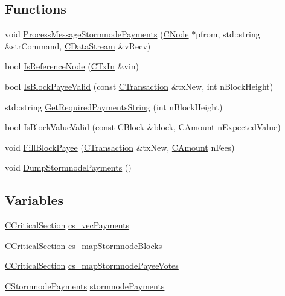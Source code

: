 \subsection*{Functions}
\begin{DoxyCompactItemize}
\item 
void \hyperlink{stormnode-payments_8h_a5233f9d84cc35d13544ea305bc906da0}{Process\+Message\+Stormnode\+Payments} (\hyperlink{class_c_node}{C\+Node} $\ast$pfrom, std\+::string \&str\+Command, \hyperlink{class_c_data_stream}{C\+Data\+Stream} \&v\+Recv)
\item 
bool \hyperlink{stormnode-payments_8h_a0bca99aa555725c39171cc06fb3e94de}{Is\+Reference\+Node} (\hyperlink{class_c_tx_in}{C\+Tx\+In} \&vin)
\item 
bool \hyperlink{stormnode-payments_8h_af9e474d79a12729ed3e96b0d1c0351b4}{Is\+Block\+Payee\+Valid} (const \hyperlink{class_c_transaction}{C\+Transaction} \&tx\+New, int n\+Block\+Height)
\item 
std\+::string \hyperlink{stormnode-payments_8h_a7828ab0b9a1302db35b658f727b260e1}{Get\+Required\+Payments\+String} (int n\+Block\+Height)
\item 
bool \hyperlink{stormnode-payments_8h_a775fd7f6eef6c395268172c278b9100b}{Is\+Block\+Value\+Valid} (const \hyperlink{class_c_block}{C\+Block} \&\hyperlink{core_8h_ace80c27428e237fe24f54ae915a36133}{block}, \hyperlink{amount_8h_a4eaf3a5239714d8c45b851527f7cb564}{C\+Amount} n\+Expected\+Value)
\item 
void \hyperlink{stormnode-payments_8h_a1c78c12ef9ef9becb2701ac56c3996ec}{Fill\+Block\+Payee} (\hyperlink{class_c_transaction}{C\+Transaction} \&tx\+New, \hyperlink{amount_8h_a4eaf3a5239714d8c45b851527f7cb564}{C\+Amount} n\+Fees)
\item 
void \hyperlink{stormnode-payments_8h_ae992438141f991b3ca132d11da230d1a}{Dump\+Stormnode\+Payments} ()
\end{DoxyCompactItemize}
\subsection*{Variables}
\begin{DoxyCompactItemize}
\item 
\hyperlink{sync_8h_a37a4692b2d517f2843655ca11af7668a}{C\+Critical\+Section} \hyperlink{stormnode-payments_8h_ad7b9616c84ed22224772799b69d7cbeb}{cs\+\_\+vec\+Payments}
\item 
\hyperlink{sync_8h_a37a4692b2d517f2843655ca11af7668a}{C\+Critical\+Section} \hyperlink{stormnode-payments_8h_ab9dc21266fc508439f6ed0422da8b214}{cs\+\_\+map\+Stormnode\+Blocks}
\item 
\hyperlink{sync_8h_a37a4692b2d517f2843655ca11af7668a}{C\+Critical\+Section} \hyperlink{stormnode-payments_8h_a339b2de1a0d1e6bb993ac7abe7f742d2}{cs\+\_\+map\+Stormnode\+Payee\+Votes}
\item 
\hyperlink{class_c_stormnode_payments}{C\+Stormnode\+Payments} \hyperlink{stormnode-payments_8h_a1d528b1b067a2f669dfd90c513a97116}{stormnode\+Payments}
\end{DoxyCompactItemize}


